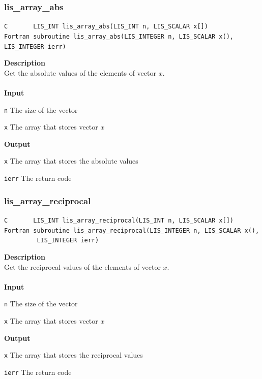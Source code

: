 \documentclass[a4paper]{article}
\newcommand{\namelistlabel}[1]{\mbox{#1}\hfill}
\newenvironment{namelist}[1]{%
\begin{list}{}
  {\let\makelabel\namelistlabel
  \settowidth{\labelwidth}{#1}
  \setlength{\leftmargin}{1.1\labelwidth}}
  }{%
\end{list}}
\begin{document}
\subsubsection{lis\_array\_abs}
\begin{screen}
\verb|C       LIS_INT lis_array_abs(LIS_INT n, LIS_SCALAR x[])|\\
\verb|Fortran subroutine lis_array_abs(LIS_INTEGER n, LIS_SCALAR x(), LIS_INTEGER ierr)|
\end{screen}
{\bf Description}\\
\indent
Get the absolute values of the elements of vector $x$.
\\ \\
\noindent
{\bf Input}
\begin{namelist}{XXXXXXXXXXXXXXXXXXXX}
\item[\tt n] The size of the vector
\item[\tt x] The array that stores vector $x$
\end{namelist}
{\bf Output}
\begin{namelist}{XXXXXXXXXXXXXXXXXXXX}
\item[\tt x] The array that stores the absolute values
\item[\tt ierr] The return code
\end{namelist}

\newpage
\subsubsection{lis\_array\_reciprocal}
\begin{screen}
\verb|C       LIS_INT lis_array_reciprocal(LIS_INT n, LIS_SCALAR x[])|\\
\verb|Fortran subroutine lis_array_reciprocal(LIS_INTEGER n, LIS_SCALAR x(),|\\
\verb|         LIS_INTEGER ierr)|
\end{screen}
{\bf Description}\\
\indent
Get the reciprocal values of the elements of vector $x$.
\\ \\
\noindent
{\bf Input}
\begin{namelist}{XXXXXXXXXXXXXXXXXXXX}
\item[\tt n] The size of the vector
\item[\tt x] The array that stores vector $x$
\end{namelist}
{\bf Output}
\begin{namelist}{XXXXXXXXXXXXXXXXXXXX}
\item[\tt x] The array that stores the reciprocal values
\item[\tt ierr] The return code
\end{namelist}
\end{document}
